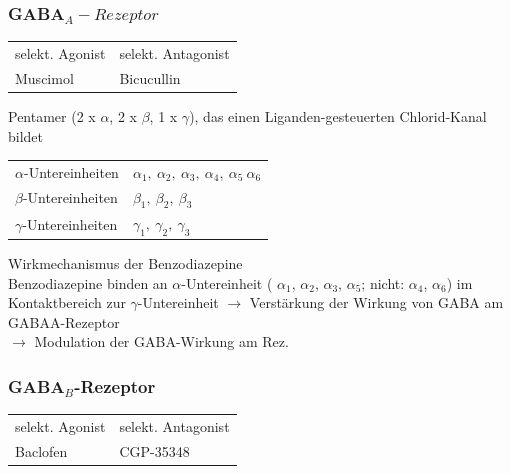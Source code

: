 \documentclass[10pt,a4paper]{report}
\begin{document}
\subsubsection{GABA$_A-Rezeptor$} %
\label{ssub:gaba__a_}
\begin{tabularx}{\textwidth}{ll}
selekt. Agonist&selekt. Antagonist\\		
Muscimol&Bicucullin\\
\end{tabularx}
Pentamer (2 x $\alpha$, 2 x $\beta$, 1 x $\gamma$), das einen Liganden-gesteuerten Chlorid-Kanal bildet\\
\begin{tabularx}{\textwidth}{lX}
$\alpha$-Untereinheiten& $\alpha_1,\:\alpha_2,\:\alpha_3,\:\alpha_4,\:\alpha_5\:\alpha_6$\\
$\beta$-Untereinheiten& $\beta_1,\:\beta_2,\:\beta_3$\\
$\gamma$-Untereinheiten& $\gamma_1,\:\gamma_2,\:\gamma_3$\\
\end{tabularx}
Wirkmechanismus der Benzodiazepine\\
Benzodiazepine binden an $\alpha$-Untereinheit ( $\alpha_1$, $\alpha_2$, $\alpha_3$, $\alpha_5$; nicht:  $\alpha_4$, $\alpha_6$) im Kontaktbereich zur $\gamma$-Untereinheit $\rightarrow$ Verstärkung der 
Wirkung von GABA am GABAA-Rezeptor\\
$\rightarrow$ Modulation der GABA-Wirkung am Rez.
\subsubsection{GABA$_B$-Rezeptor} %
\label{ssub:gaba__b_rezeptor}
\begin{tabularx}{\textwidth}{ll}
selekt. Agonist&selekt. Antagonist\\		
Baclofen&CGP-35348\\
\end{tabularx}
\end{document}
